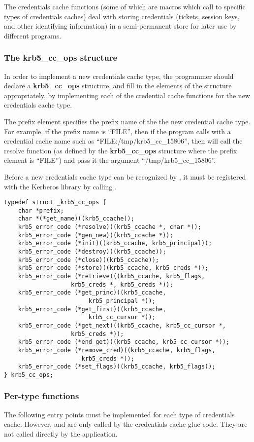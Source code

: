 The credentials cache functions (some of which are macros which call to
specific types of credentials caches) deal with storing credentials
(tickets, session keys, and other identifying information) in a
semi-permanent store for later use by different programs.

\subsubsection{The krb5_cc_ops structure}
In order to implement a new credentials cache type, the programmer should
declare a {\bf krb5_cc_ops} structure, and fill in the elements of the
structure appropriately, by implementing each of the credential cache
functions for the new credentials cache type.  

The prefix element specifies the prefix name of the the new credential
cache type.  For example, if the prefix name is ``FILE'', then if the
program calls  with a credential cache name
such as ``FILE:/tmp/krb5_cc_15806'', then 
will call the resolve function (as defined by the {\bf krb5_cc_ops}
structure where the prefix element is ``FILE'') and pass it the
argument ``/tmp/krb5_cc_15806''.

Before a new credentials cache type can be recognized by
, it must be registered with the Kerberos
library by calling .

\begin{verbatim}
typedef struct _krb5_cc_ops {
	char *prefix;
	char *(*get_name)((krb5_ccache));
	krb5_error_code (*resolve)((krb5_ccache *, char *));
	krb5_error_code (*gen_new)((krb5_ccache *));
	krb5_error_code (*init)((krb5_ccache, krb5_principal));
	krb5_error_code (*destroy)((krb5_ccache));
	krb5_error_code (*close)((krb5_ccache));
	krb5_error_code (*store)((krb5_ccache, krb5_creds *));
	krb5_error_code (*retrieve)((krb5_ccache, krb5_flags,
				   krb5_creds *, krb5_creds *));
	krb5_error_code (*get_princ)((krb5_ccache,
						krb5_principal *));
	krb5_error_code (*get_first)((krb5_ccache,
						krb5_cc_cursor *));
	krb5_error_code (*get_next)((krb5_ccache, krb5_cc_cursor *,
				   krb5_creds *));
	krb5_error_code (*end_get)((krb5_ccache, krb5_cc_cursor *));
	krb5_error_code (*remove_cred)((krb5_ccache, krb5_flags,
				      krb5_creds *));
	krb5_error_code (*set_flags)((krb5_ccache, krb5_flags));
} krb5_cc_ops;
\end{verbatim}


\subsubsection{Per-type functions}
The following entry points must be implemented for each type of
credentials cache.  However,  and
 are only called by the credentials cache glue code.
They are not called directly by the application.


